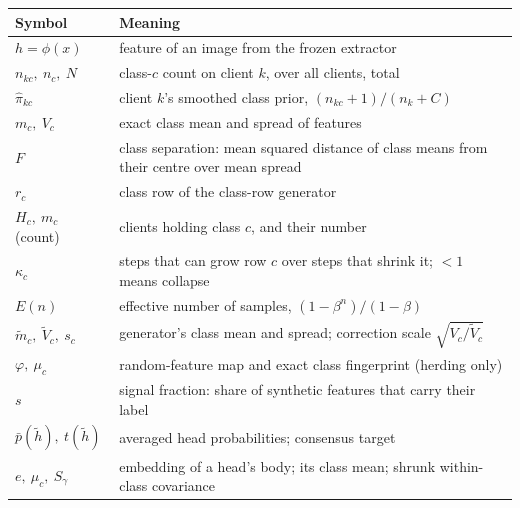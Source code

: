 \documentclass[11pt]{article}
\theoremstyle{plain}
\theoremstyle{definition}
\begin{document}
\begin{center}
\small
\begin{tabularx}{\linewidth}{>{\raggedright\arraybackslash}p{2.6cm}X}
\toprule
Symbol & Meaning\\
\midrule
$h=\phi(x)$ & feature of an image from the frozen extractor\\
$n_{kc},\ n_c,\ N$ & class-$c$ count on client $k$, over all clients, total\\
$\hat\pi_{kc}$ & client $k$'s smoothed class prior, $(n_{kc}+1)/(n_k+C)$\\
$m_c,\ V_c$ & exact class mean and spread of features\\
$F$ & class separation: mean squared distance of class means from their centre over mean spread\\
$r_c$ & class row of the class-row generator\\
$H_c,\ m_c$ (count) & clients holding class $c$, and their number\\
$\kappa_c$ & steps that can grow row $c$ over steps that shrink it; $<1$ means collapse\\
$E(n)$ & effective number of samples, $(1-\beta^n)/(1-\beta)$\\
$\tilde m_c,\ \tilde V_c,\ s_c$ & generator's class mean and spread; correction scale $\sqrt{V_c/\tilde V_c}$\\
$\varphi,\ \mu_c$ & random-feature map and exact class fingerprint (herding only)\\
$s$ & signal fraction: share of synthetic features that carry their label\\
$\bar p(\tilde h),\ t(\tilde h)$ & averaged head probabilities; consensus target\\
$e,\ \mu_c,\ S_\gamma$ & embedding of a head's body; its class mean; shrunk within-class covariance\\
\bottomrule
\end{tabularx}
\end{center}
\end{document}
